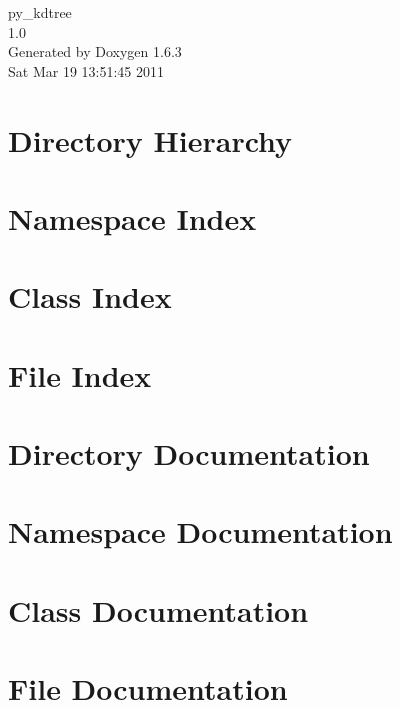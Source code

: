\documentclass[a4paper]{book}
\begin{document}
\hypersetup{pageanchor=false}
\begin{titlepage}
\vspace*{7cm}
\begin{center}
{\Large py\_\-kdtree \\[1ex]\large 1.0 }\\
\vspace*{1cm}
{\large Generated by Doxygen 1.6.3}\\
\vspace*{0.5cm}
{\small Sat Mar 19 13:51:45 2011}\\
\end{center}
\end{titlepage}
\clearemptydoublepage
{}
\tableofcontents
\clearemptydoublepage
{}
\hypersetup{pageanchor=true}
\chapter{Directory Hierarchy}

\chapter{Namespace Index}

\chapter{Class Index}

\chapter{File Index}

\chapter{Directory Documentation}


\chapter{Namespace Documentation}


\chapter{Class Documentation}




\chapter{File Documentation}









\printindex
\end{document}
